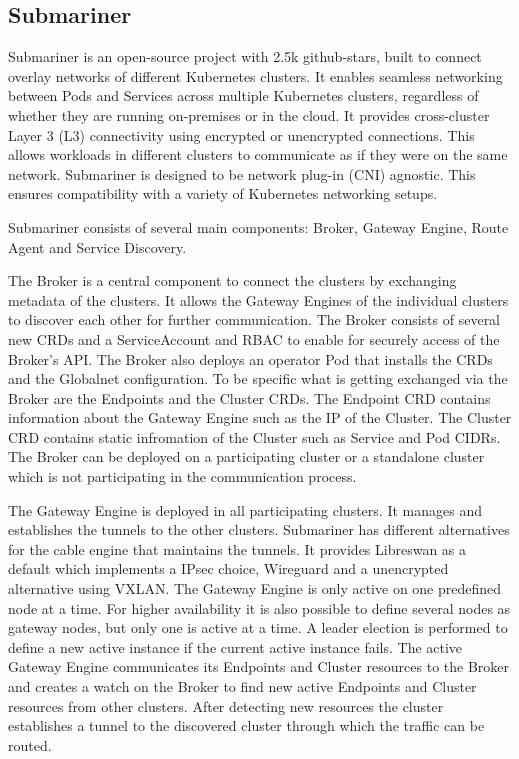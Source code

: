 %
\subsection{Submariner}
%
Submariner is an open-source project with 2.5k github-stars, built to connect overlay networks of different Kubernetes clusters. It enables seamless networking between Pods and Services across multiple Kubernetes clusters, regardless of whether they are running on-premises or in the cloud. It provides cross-cluster Layer 3 (L3) connectivity using encrypted or unencrypted connections. This allows workloads in different clusters to communicate as if they were on the same network. Submariner is designed to be network plug-in (CNI) agnostic. This ensures compatibility with a variety of Kubernetes networking setups.

Submariner consists of several main components: Broker, Gateway Engine, Route Agent and Service Discovery.

The Broker is a central component to connect the clusters by exchanging metadata of the clusters. 
It allows the Gateway Engines of the individual clusters to discover each other for further communication. 
The Broker consists of several new CRDs and a ServiceAccount and RBAC to enable for securely access of the Broker's API.
The Broker also deploys an operator Pod that installs the CRDs and the Globalnet configuration.
To be specific what is getting exchanged via the Broker are the Endpoints and the Cluster CRDs.
The Endpoint CRD contains information about the Gateway Engine such as the IP of the Cluster.
The Cluster CRD contains static infromation of the Cluster such as Service and Pod CIDRs.
The Broker can be deployed on a participating cluster or a standalone cluster which is not participating in the communication process.

The Gateway Engine is deployed in all participating clusters. It manages and establishes the tunnels to the other clusters.
Submariner has different alternatives for the cable engine that maintains the tunnels. 
It provides Libreswan as a default which implements a IPsec choice, Wireguard and a unencrypted alternative using VXLAN.
The Gateway Engine is only active on one predefined node at a time.
For higher availability it is also possible to define several nodes as gateway nodes, but only one is active at a time.
A leader election is performed to define a new active instance if the current active instance fails.
The active Gateway Engine communicates its Endpoints and Cluster resources to the Broker and creates a watch on the Broker to find new active Endpoints and Cluster resources from other clusters. 
After detecting new resources the cluster establishes a tunnel to the discovered cluster through which the traffic can be routed.

